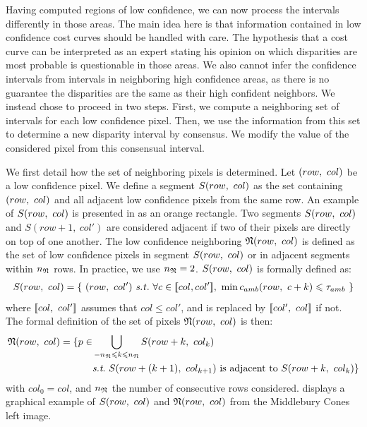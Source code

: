 Having computed regions of low confidence, we can now process the intervals differently in those areas. The main idea here is that information contained in low confidence cost curves should be handled with care. The hypothesis that a cost curve can be interpreted as an expert stating his opinion on which disparities are most probable is questionable in those areas. We also cannot infer the confidence intervals from intervals in neighboring high confidence areas, as there is no guarantee the disparities are the same as their high confident neighbors. We instead chose to proceed in two steps. First, we compute a neighboring set of intervals for each low confidence pixel. Then, we use the information from this set to determine a new disparity interval by consensus. We modify the value of the considered pixel from this consensual interval.

We first detail how the set of neighboring pixels is determined. Let $(row, ~col)$ be a low confidence pixel. We define a segment $S(row, ~col)$ as the set containing $(row, ~col)$ and all adjacent low confidence pixels from the same row. An example of $S(row, ~col)$ is presented in  as an orange rectangle. Two segments $S(row, ~col)$ and $S(row+1, ~col')$ are considered adjacent if two of their pixels are directly on top of one another. The low confidence neighboring $\mathfrak{N}(row,~col)$ is defined as the set of low confidence pixels in segment $S(row, ~col)$ or in adjacent segments within $n_{\mathfrak{N}}$ rows. In practice, we use $n_{\mathfrak{N}}=2$. $S(row, ~col)$ is formally defined as:
\begin{align}
    S(\rowcol) = \{~ (row,~col') \text{ \st }~\forall c\in\opi col, col'\cli,~\min c_{amb}(row, ~c+k)\leqslant \tau_{amb}~\}
\end{align}
where $[\![ col,~col']\!]$ assumes that $col\leqslant col'$, and is replaced by $[\![ col',~col]\!]$ if not. The formal definition of the set of pixels $\mathfrak{N}(row,~col)$ is then:
\begin{align}
    \N(row,~col) = \{ p\in &\bigcup_{-n_\N\leqslant k\leqslant n_\N}S(row+k, ~col_k)\nonumber\\
    &\st~S(row + (k+1), ~col_{k+1})\text{ is adjacent to }S(row+k, ~col_{k})\}\label{eq:n_N}
\end{align}
with $col_0=col$, and $n_{\mathfrak{N}}$ the number of consecutive rows considered.  displays a graphical example of $S(row, ~col)$ and $\mathfrak{N}(row, ~col)$ from the Middlebury Cones left image.

